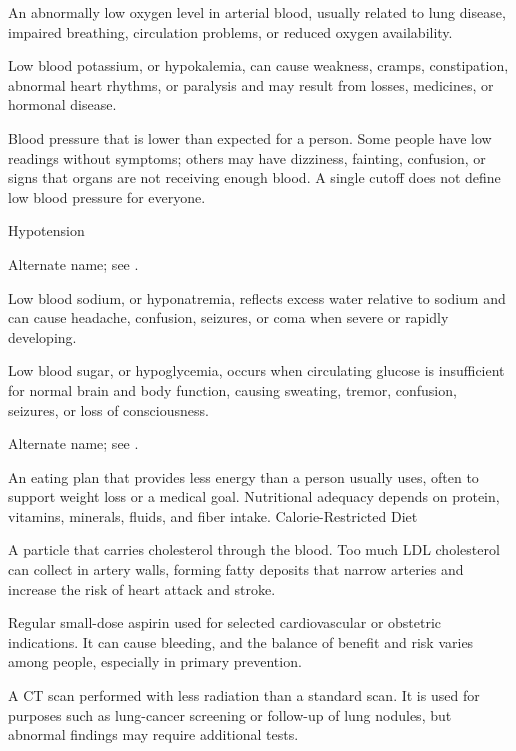  An abnormally low oxygen level in arterial blood, usually related to lung disease, impaired breathing, circulation problems, or reduced oxygen availability.

 Low blood potassium, or hypokalemia, can cause weakness, cramps, constipation, abnormal heart rhythms, or paralysis and may result from losses, medicines, or hormonal disease.

 Blood pressure that is lower than expected for a person. Some people have low readings without symptoms; others may have dizziness, fainting, confusion, or signs that organs are not receiving enough blood. A single cutoff does not define low blood pressure for everyone.

\synonyms
Hypotension

 Alternate name; see .

 Low blood sodium, or hyponatremia, reflects excess water relative to sodium and can cause headache, confusion, seizures, or coma when severe or rapidly developing.

 Low blood sugar, or hypoglycemia, occurs when circulating glucose is insufficient for normal brain and body function, causing sweating, tremor, confusion, seizures, or loss of consciousness.

 Alternate name; see .

 An eating plan that provides less energy than a person usually uses, often to support weight loss or a medical goal. Nutritional adequacy depends on protein, vitamins, minerals, fluids, and fiber intake.
\synonyms
Calorie-Restricted Diet

 A particle that carries cholesterol through the blood. Too much LDL cholesterol can collect in artery walls, forming fatty deposits that narrow arteries and increase the risk of heart attack and stroke.

 Regular small-dose aspirin used for selected cardiovascular or obstetric indications. It can cause bleeding, and the balance of benefit and risk varies among people, especially in primary prevention.

 A CT scan performed with less radiation than a standard scan. It is used for purposes such as lung-cancer screening or follow-up of lung nodules, but abnormal findings may require additional tests.

